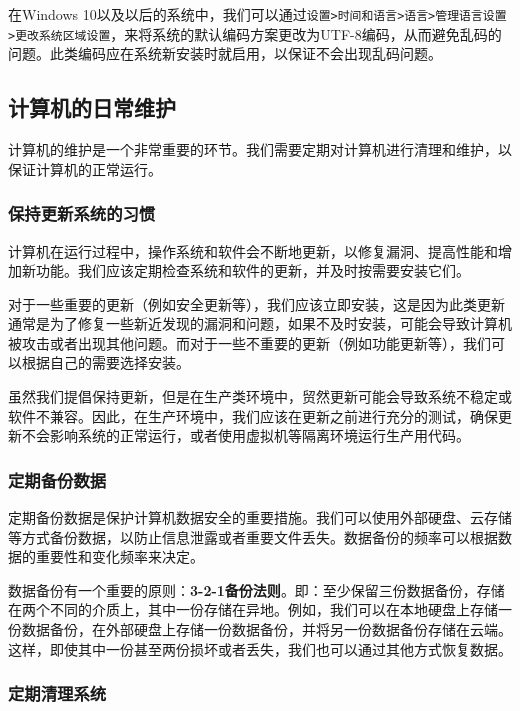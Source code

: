 \documentclass[../main.tex]{subfiles}
\begin{document}
在Windows 10以及以后的系统中，我们可以通过\texttt{设置>时间和语言>语言>管理语言设置>更改系统区域设置}，来将系统的默认编码方案更改为UTF-8编码，从而避免乱码的问题。此类编码应在系统新安装时就启用，以保证不会出现乱码问题。

\subsection{计算机的日常维护}

计算机的维护是一个非常重要的环节。我们需要定期对计算机进行清理和维护，以保证计算机的正常运行。

\subsubsection{保持更新系统的习惯}

计算机在运行过程中，操作系统和软件会不断地更新，以修复漏洞、提高性能和增加新功能。我们应该定期检查系统和软件的更新，并及时按需要安装它们。

对于一些重要的更新（例如安全更新等），我们应该立即安装，这是因为此类更新通常是为了修复一些新近发现的漏洞和问题，如果不及时安装，可能会导致计算机被攻击或者出现其他问题。而对于一些不重要的更新（例如功能更新等），我们可以根据自己的需要选择安装。

\begin{caution}
  虽然我们提倡保持更新，但是在生产类环境中，贸然更新可能会导致系统不稳定或软件不兼容。因此，在生产环境中，我们应该在更新之前进行充分的测试，确保更新不会影响系统的正常运行，或者使用虚拟机等隔离环境运行生产用代码。
\end{caution}

\subsubsection{定期备份数据}

定期备份数据是保护计算机数据安全的重要措施。我们可以使用外部硬盘、云存储等方式备份数据，以防止信息泄露或者重要文件丢失。数据备份的频率可以根据数据的重要性和变化频率来决定。

数据备份有一个重要的原则：\textbf{3-2-1备份法则}。即：至少保留三份数据备份，存储在两个不同的介质上，其中一份存储在异地。例如，我们可以在本地硬盘上存储一份数据备份，在外部硬盘上存储一份数据备份，并将另一份数据备份存储在云端。这样，即使其中一份甚至两份损坏或者丢失，我们也可以通过其他方式恢复数据。

\subsubsection{定期清理系统}
\end{document}
